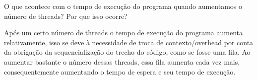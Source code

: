 \question O que acontece com o tempo de execução do programa quando aumentamos o número de threads? Por que isso ocorre?
\begin{solution}
    Após um certo número de threads o tempo de execução do programa aumenta relativamente, isso se deve à necessidade de troca de contexto/overhead por conta da obrigação da sequencialização do trecho do código, como se fosse uma fila. Ao aumentar bastante o número dessas threads, essa fila aumenta cada vez mais, consequentemente aumentando o tempo de espera e seu tempo de execução.
\end{solution}
